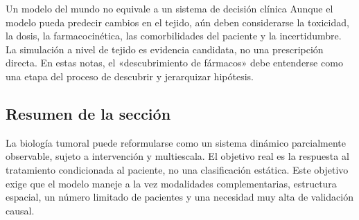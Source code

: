 
\begin{warningbox}{Un modelo del mundo no equivale a un sistema de decisión clínica}
Aunque el modelo pueda predecir cambios en el tejido, aún deben considerarse la toxicidad, la dosis, la farmacocinética, las comorbilidades del paciente y la incertidumbre. La simulación a nivel de tejido es evidencia candidata, no una prescripción directa. En estas notas, el «descubrimiento de fármacos» debe entenderse como una etapa del proceso de descubrir y jerarquizar hipótesis.
\end{warningbox}

\subsection{Resumen de la sección}

La biología tumoral puede reformularse como un sistema dinámico parcialmente observable, sujeto a intervención y multiescala. El objetivo real es la respuesta al tratamiento condicionada al paciente, no una clasificación estática. Este objetivo exige que el modelo maneje a la vez modalidades complementarias, estructura espacial, un número limitado de pacientes y una necesidad muy alta de validación causal.
